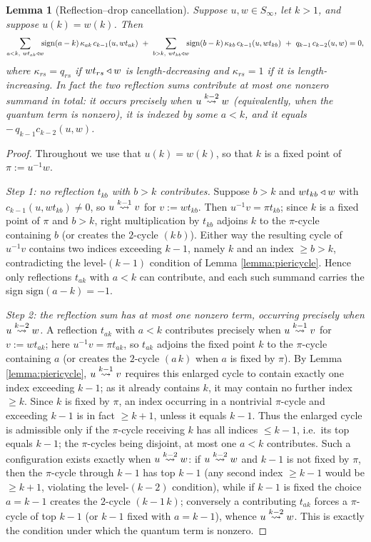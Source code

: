 \documentclass{amsart}
\newtheorem{lemma}{Lemma}[section]
\theoremstyle{definition}
\theoremstyle{remark}
\numberwithin{equation}{section}
\newcommand{\xrightsquigarrow}[2][]{%
	\mathrel{\mathop{\rightsquigarrow}\limits^{\scriptstyle #2}%
	\ifx\hfuzz#1\hfuzz\else_{\scriptstyle #1}\fi}%
}
\newcommand{\tom}[1]{\ensuremath{\xrightsquigarrow{#1}}}
\begin{document}
\begin{lemma}[Reflection--drop cancellation] \label{lemma:reflectioncancel}
Suppose $u,w\in S_\infty$, let $k>1$, and suppose $u(k)=w(k)$. Then
$$\sum_{\substack{a<k,\ wt_{ak}\triangleleft w}}\!\!\!\mathrm{sign}(a-k)\,\kappa_{ak}\,c_{k-1}(u,wt_{ak})\ +\ \sum_{\substack{b>k,\ wt_{kb}\triangleleft w}}\!\!\!\mathrm{sign}(b-k)\,\kappa_{kb}\,c_{k-1}(u,wt_{kb})\ +\ q_{k-1}\,c_{k-2}(u,w)=0,$$
where $\kappa_{rs}=q_{rs}$ if $wt_{rs}\triangleleft w$ is length-decreasing and $\kappa_{rs}=1$ if it is length-increasing. In fact the two reflection sums contribute at most one nonzero summand in total: it occurs precisely when $u\tom{k-2}w$ (equivalently, when the quantum term is nonzero), it is indexed by some $a<k$, and it equals $-\,q_{k-1}c_{k-2}(u,w)$.
\end{lemma}
\begin{proof}
Throughout we use that $u(k)=w(k)$, so that $k$ is a fixed point of $\pi:=u^{-1}w$.

\emph{Step 1: no reflection $t_{kb}$ with $b>k$ contributes.} Suppose $b>k$ and $wt_{kb}\triangleleft w$ with $c_{k-1}(u,wt_{kb})\neq0$, so $u\tom{k-1}v$ for $v:=wt_{kb}$. Then $u^{-1}v=\pi t_{kb}$; since $k$ is a fixed point of $\pi$ and $b>k$, right multiplication by $t_{kb}$ adjoins $k$ to the $\pi$-cycle containing $b$ (or creates the $2$-cycle $(k\,b)$). Either way the resulting cycle of $u^{-1}v$ contains two indices exceeding $k-1$, namely $k$ and an index $\geq b>k$, contradicting the level-$(k-1)$ condition of Lemma \ref{lemma:piericycle}. Hence only reflections $t_{ak}$ with $a<k$ can contribute, and each such summand carries the sign $\mathrm{sign}(a-k)=-1$.

\emph{Step 2: the reflection sum has at most one nonzero term, occurring precisely when $u\tom{k-2}w$.} A reflection $t_{ak}$ with $a<k$ contributes precisely when $u\tom{k-1}v$ for $v:=wt_{ak}$; here $u^{-1}v=\pi t_{ak}$, so $t_{ak}$ adjoins the fixed point $k$ to the $\pi$-cycle containing $a$ (or creates the $2$-cycle $(a\,k)$ when $a$ is fixed by $\pi$). By Lemma \ref{lemma:piericycle}, $u\tom{k-1}v$ requires this enlarged cycle to contain exactly one index exceeding $k-1$; as it already contains $k$, it may contain no further index $\geq k$. Since $k$ is fixed by $\pi$, an index occurring in a nontrivial $\pi$-cycle and exceeding $k-1$ is in fact $\geq k+1$, unless it equals $k-1$. Thus the enlarged cycle is admissible only if the $\pi$-cycle receiving $k$ has all indices $\leq k-1$, i.e.\ its top equals $k-1$; the $\pi$-cycles being disjoint, at most one $a<k$ contributes. Such a configuration exists exactly when $u\tom{k-2}w$: if $u\tom{k-2}w$ and $k-1$ is not fixed by $\pi$, then the $\pi$-cycle through $k-1$ has top $k-1$ (any second index $\geq k-1$ would be $\geq k+1$, violating the level-$(k-2)$ condition), while if $k-1$ is fixed the choice $a=k-1$ creates the $2$-cycle $(k-1\,k)$; conversely a contributing $t_{ak}$ forces a $\pi$-cycle of top $k-1$ (or $k-1$ fixed with $a=k-1$), whence $u\tom{k-2}w$. This is exactly the condition under which the quantum term is nonzero.


\end{proof}
\end{document}
